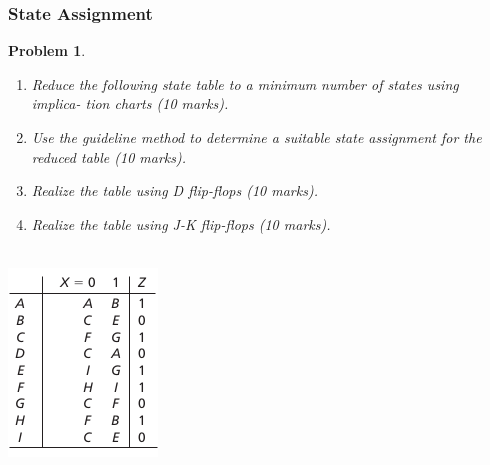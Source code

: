 \documentclass[twocolumn]{article}
\newtheorem{prob}{Problem}
\begin{document}
\subsubsection*{State Assignment}
\begin{prob}
  \begin{enumerate}
  \item Reduce the following state table to a minimum number of states using implica-
    tion charts (10 marks).
  \item Use the guideline method to determine a suitable state assignment for the
    reduced table (10 marks).
  \item Realize the table using D flip-flops (10 marks).
  \item Realize the table using J-K flip-flops (10 marks).
  \end{enumerate}\\
  \includegraphics[width=\linewidth]{fig-15.25.png}
\end{prob}




\end{document}
